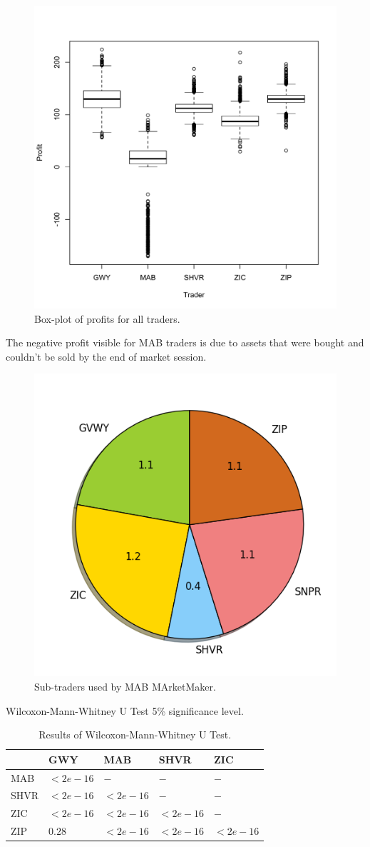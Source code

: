 \documentclass{llncs}
\begin{document}
\begin{figure}[ht]
  \centering
  \includegraphics[width=.7\textwidth]{fig/box.pdf}
  \caption{Box-plot of profits for all traders.\label{fig:box}}
\end{figure}

The negative profit visible for MAB traders is due to assets that were bought and couldn't be sold by the end of market session.\\

\begin{figure}[ht]
  \centering
  \includegraphics[width=.5\textwidth]{fig/pie.png}
  \caption{Sub-traders used by MAB MArketMaker.\label{fig:MABalgo}}
\end{figure}


Wilcoxon-Mann-Whitney U Test 5\% significance level.\\

\begin{table}[ht]
  \centering
  \begin{tabular}{ p{5em} | p{5em} p{5em} p{5em} p{5em} }
         &GWY    &MAB    &SHVR   &ZIC   \\
    \hline
    MAB  &$<2e-16 $&$-      $&$-      $&$-     $\\
    SHVR &$<2e-16 $&$<2e-16 $&$-      $&$-     $\\
    ZIC  &$<2e-16 $&$<2e-16 $&$<2e-16 $&$-     $\\
    ZIP  &$0.28   $&$<2e-16 $&$<2e-16 $&$<2e-16$
  \end{tabular}
  \vspace*{1em}
  \caption{Results of Wilcoxon-Mann-Whitney U Test.\label{tab:wilcox}}
\end{table}
\end{document}
